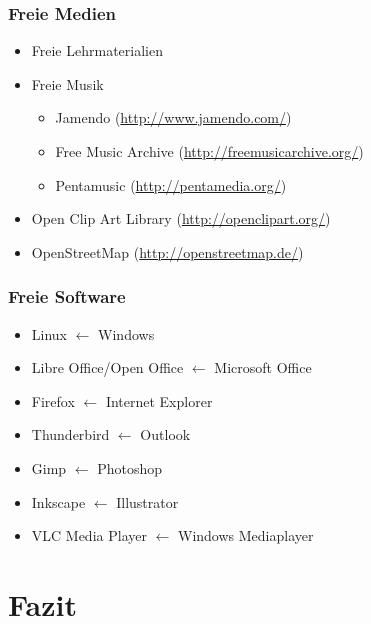 \documentclass[14pt,handout]{beamer}
\begin{document}
\begin{frame}
  \frametitle{Freie Medien}
  \begin{itemize}
    \item<2-> Freie Lehrmaterialien
    \item<3-> Freie Musik
      \begin{itemize}
        \item Jamendo (\url{http://www.jamendo.com/})
        \item Free Music Archive (\url{http://freemusicarchive.org/})
        \item Pentamusic (\url{http://pentamedia.org/})
      \end{itemize}
    \item<4-> Open Clip Art Library (\url{http://openclipart.org/})
    \item<5-> OpenStreetMap (\url{http://openstreetmap.de/})
  \end{itemize}
\end{frame}

\begin{frame}
  \frametitle{Freie Software}
  \begin{itemize}
  \item Linux $ \gets $ Windows
    \item Libre Office/Open Office $ \gets $ Microsoft Office
    \item Firefox $ \gets $ Internet Explorer
    \item Thunderbird $ \gets $ Outlook
    \item Gimp $ \gets $ Photoshop
    \item Inkscape $ \gets $ Illustrator
    \item VLC Media Player $ \gets $ Windows Mediaplayer
  \end{itemize}
\end{frame}

\section{Fazit}
\subsection{}
\end{document}
